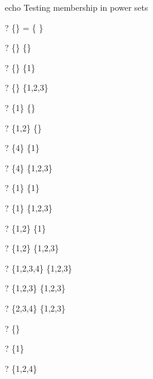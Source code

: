 echo     Testing membership in power sets
\begin{zed} \vdash?  \power \{\} = \{ \emptyset \} \end{zed}
\begin{zed} \vdash?  \{\} \in \power \{\} \end{zed}
\begin{zed} \vdash?  \{\} \in \power \{1\} \end{zed}
\begin{zed} \vdash?  \{\} \in \power \{1,2,3\} \end{zed}
\begin{zed} \vdash?  \{1\} \notin \power \{\} \end{zed}
\begin{zed} \vdash?  \{1,2\} \notin \power \{\} \end{zed}
\begin{zed} \vdash?  \{4\} \notin \power \{1\} \end{zed}
\begin{zed} \vdash?  \{4\} \notin \power \{1,2,3\} \end{zed}
\begin{zed} \vdash?  \{1\} \in \power \{1\} \end{zed}
\begin{zed} \vdash?  \{1\} \in \power \{1,2,3\} \end{zed}
\begin{zed} \vdash?  \{1,2\} \notin \power \{1\} \end{zed}
\begin{zed} \vdash?  \{1,2\} \in \power \{1,2,3\} \end{zed}
\begin{zed} \vdash?  \{1,2,3,4\} \notin \power \{1,2,3\} \end{zed}
\begin{zed} \vdash?  \{1,2,3\} \in \power \{1,2,3\} \end{zed}
\begin{zed} \vdash?  \{2,3,4\} \notin \power \{1,2,3\} \end{zed}
\begin{zed} \vdash?  \{\} \in \power \nat \end{zed}
\begin{zed} \vdash?  \{1\} \in \power \nat \end{zed}
\begin{zed} \vdash?  \{1,2,4\} \in \power \nat \end{zed}

